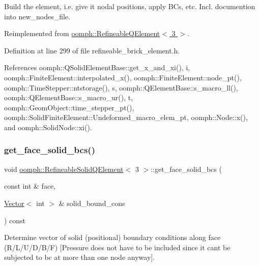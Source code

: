 Build the element, i.\+e. give it nodal positions, apply B\+Cs, etc. Incl. documention into new\+\_\+nodes\+\_\+file. 



Reimplemented from \hyperlink{classoomph_1_1RefineableQElement_3_013_01_4_a8e7f6c2a6aa695c1b6fcd4dbeba3fac6}{oomph\+::\+Refineable\+Q\+Element$<$ 3 $>$}.



Definition at line 299 of file refineable\+\_\+brick\+\_\+element.\+h.



References oomph\+::\+Q\+Solid\+Element\+Base\+::get\+\_\+x\+\_\+and\+\_\+xi(), i, oomph\+::\+Finite\+Element\+::interpolated\+\_\+x(), oomph\+::\+Finite\+Element\+::node\+\_\+pt(), oomph\+::\+Time\+Stepper\+::ntstorage(), s, oomph\+::\+Q\+Element\+Base\+::s\+\_\+macro\+\_\+ll(), oomph\+::\+Q\+Element\+Base\+::s\+\_\+macro\+\_\+ur(), t, oomph\+::\+Geom\+Object\+::time\+\_\+stepper\+\_\+pt(), oomph\+::\+Solid\+Finite\+Element\+::\+Undeformed\+\_\+macro\+\_\+elem\+\_\+pt, oomph\+::\+Node\+::x(), and oomph\+::\+Solid\+Node\+::xi().

\mbox{\label{classoomph_1_1RefineableSolidQElement_3_013_01_4_ac880a52e8224bd4798969c5c7b5fb540}} 
\subsubsection{\texorpdfstring{get\+\_\+face\+\_\+solid\+\_\+bcs()}{get\_face\_solid\_bcs()}}
{\footnotesize\ttfamily void \hyperlink{classoomph_1_1RefineableSolidQElement}{oomph\+::\+Refineable\+Solid\+Q\+Element}$<$ 3 $>$\+::get\+\_\+face\+\_\+solid\+\_\+bcs (\begin{DoxyParamCaption}\item[{const int \&}]{face,  }\item[{\hyperlink{classoomph_1_1Vector}{Vector}$<$ int $>$ \&}]{solid\+\_\+bound\+\_\+cons }\end{DoxyParamCaption}) const}



Determine vector of solid (positional) boundary conditions along face (R/\+L/\+U/\+D/\+B/F) \mbox{[}Pressure does not have to be included since it can\textquotesingle{}t be subjected to bc at more than one node anyway\mbox{]}. 

